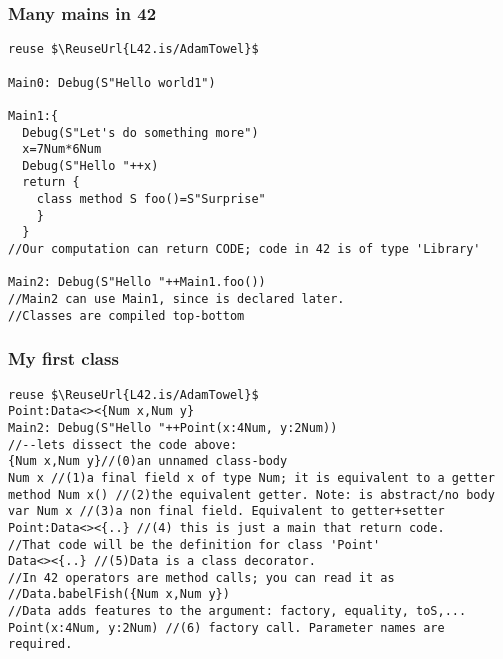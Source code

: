 \begin{frame}[fragile]
\frametitle{Many mains in 42}
\begin{NiceCode}{59ex}{0.8}
\begin{lstlisting}
reuse $\ReuseUrl{L42.is/AdamTowel}$

Main0: Debug(S"Hello world1")

Main1:{
  Debug(S"Let's do something more")  
  x=7Num*6Num
  Debug(S"Hello "++x)
  return {
    class method S foo()=S"Surprise"
    }
  }
//Our computation can return CODE; code in 42 is of type 'Library'

Main2: Debug(S"Hello "++Main1.foo())
//Main2 can use Main1, since is declared later.
//Classes are compiled top-bottom
\end{lstlisting}
\end{NiceCode}
\end{frame}

\begin{frame}[fragile]
\frametitle{My first class}
\begin{NiceCode}{59ex}{0.8}
\begin{lstlisting}
reuse $\ReuseUrl{L42.is/AdamTowel}$
Point:Data<><{Num x,Num y}
Main2: Debug(S"Hello "++Point(x:4Num, y:2Num))
//--lets dissect the code above:
{Num x,Num y}//(0)an unnamed class-body
Num x //(1)a final field x of type Num; it is equivalent to a getter
method Num x() //(2)the equivalent getter. Note: is abstract/no body
var Num x //(3)a non final field. Equivalent to getter+setter
Point:Data<><{..} //(4) this is just a main that return code.
//That code will be the definition for class 'Point'
Data<><{..} //(5)Data is a class decorator.
//In 42 operators are method calls; you can read it as 
//Data.babelFish({Num x,Num y})
//Data adds features to the argument: factory, equality, toS,...
Point(x:4Num, y:2Num) //(6) factory call. Parameter names are required.
\end{lstlisting}
\end{NiceCode}
\end{frame}


